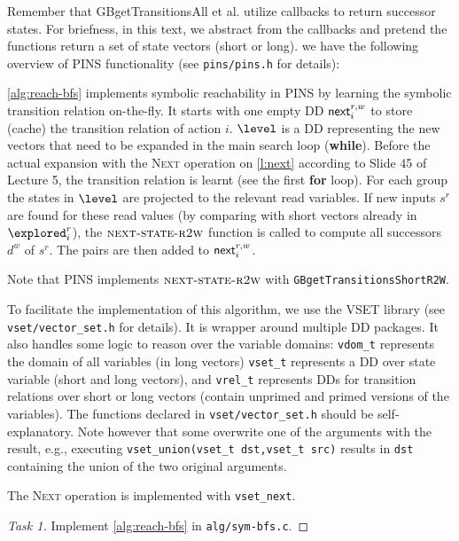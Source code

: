 \documentclass[12pt]{article}
\begin{document}
Remember that GBgetTransitionsAll et al. utilize callbacks to return successor states.
For briefness, in this text, we abstract from the callbacks and pretend the functions
return a set of state vectors (short or long).
we have the following overview of PINS functionality (see \texttt{pins/pins.h} for details):


\autoref{alg:reach-bfs} implements symbolic reachability in PINS
by learning the symbolic transition relation on-the-fly.
It starts with one empty DD $\mathsf{next}^{r,w}_i$ to store (cache)
the transition relation of action $i$.
$\level$ is a DD representing the new vectors that need to be
expanded in the main search loop (\textbf{while}).
Before the actual expansion with the \textsc{Next} operation 
on \autoref{l:next} according to Slide 45 of Lecture 5,
the transition relation is learnt (see the first \textbf{for} loop).
For each group the states in $\level$ are projected to the
relevant read variables. If new inputs $s^r$ are found for these
read values (by comparing with short vectors already in $\explored^r_i$),
the $\textsc{next-state-r2w}$ function is called to compute all successors
$d^w$ of $s^r$. The pairs  are then added to
 $\mathsf{next}^{r,w}_i$.

Note that PINS implements $\textsc{next-state-r2w}$ with \texttt{GBgetTransitionsShortR2W}.

To facilitate the implementation of this algorithm, we use the
VSET library (see \texttt{vset/vector\_set.h} for details).
It is wrapper around multiple DD packages. It also handles some
logic to reason over the variable domains:
\texttt{vdom\_t} represents the domain of all variables (in long vectors)
\texttt{vset\_t} represents a DD over state variable (short and long vectors),
and \texttt{vrel\_t} represents DDs for transition relations
over short or long vectors (contain unprimed and primed versions of the variables).
The functions declared in \texttt{vset/vector\_set.h} should be
self-explanatory. Note however that some overwrite one of the arguments
with the result, e.g., executing \texttt{vset\_union(vset\_t dst,vset\_t src)}
results in \texttt{dst} containing the union of the two original arguments.

The \textsc{Next} operation is implemented with \texttt{vset\_next}.

\begin{proof}[Task 1]
Implement \autoref{alg:reach-bfs} in \texttt{alg/sym-bfs.c}.
\end{proof}
\end{document}
